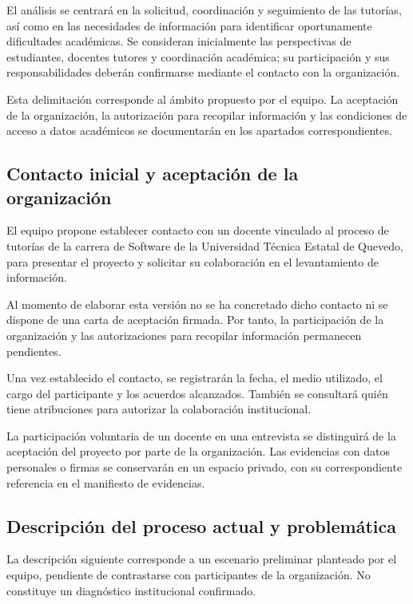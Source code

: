 \documentclass[11pt,a4paper]{article}
\begin{document}
El análisis se centrará en la solicitud, coordinación y seguimiento
de las tutorías, así como en las necesidades de información para
identificar oportunamente dificultades académicas. Se consideran
inicialmente las perspectivas de estudiantes, docentes tutores
y coordinación académica; su participación y sus responsabilidades
deberán confirmarse mediante el contacto con la organización.

Esta delimitación corresponde al ámbito propuesto por el equipo.
La aceptación de la organización, la autorización para recopilar
información y las condiciones de acceso a datos académicos se
documentarán en los apartados correspondientes.

\subsection{Contacto inicial y aceptación de la organización}

El equipo propone establecer contacto con un docente
vinculado al proceso de tutorías de la carrera de Software
de la Universidad Técnica Estatal de Quevedo, para presentar
el proyecto y solicitar su colaboración en el levantamiento
de información.

Al momento de elaborar esta versión no se ha concretado
dicho contacto ni se dispone de una carta de aceptación
firmada. Por tanto, la participación de la organización
y las autorizaciones para recopilar información permanecen
pendientes.

Una vez establecido el contacto, se registrarán la fecha,
el medio utilizado, el cargo del participante y los acuerdos
alcanzados. También se consultará quién tiene atribuciones
para autorizar la colaboración institucional.

La participación voluntaria de un docente en una entrevista
se distinguirá de la aceptación del proyecto por parte de
la organización. Las evidencias con datos personales o
firmas se conservarán en un espacio privado, con su
correspondiente referencia en el manifiesto de evidencias.

\subsection{Descripción del proceso actual y problemática}

La descripción siguiente corresponde a un escenario preliminar
planteado por el equipo, pendiente de contrastarse con participantes
de la organización. No constituye un diagnóstico institucional
confirmado.
\end{document}
